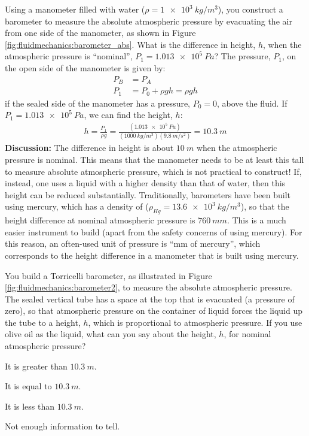 {{\begin{example}{Using a manometer filled with water ($\rho=\SI{1e3}{kg/m^3}$), you construct a barometer to measure the absolute atmospheric pressure by evacuating the air from one side of the manometer, as shown in Figure \ref{fig:fluidmechanics:barometer_abs}. What is the difference in height, $h$, when the atmospheric pressure is ``nominal'', $P_1=\SI{1.013e5}{Pa}$?}
The pressure, $P_1$, on the open side of the manometer is given by:
\begin{align*}
P_B &= P_A\\
P_1&= P_0 + \rho g h = \rho g h
\end{align*}
if the sealed side of the manometer has a pressure, $P_0=0$, above the fluid. If $P_1=\SI{1.013e5}{Pa}$, we can find the height, $h$:
\begin{align*}
h=\frac{P_1}{\rho g}=\frac{(\SI{1.013e5}{Pa})}{(\SI{1000}{kg/m^3})(\SI{9.8}{m/s^2})}=\SI{10.3}{m}
\end{align*}
\textbf{Discussion: }The difference in height is about $\SI{10}{m}$ when the atmospheric pressure is nominal. This means that the manometer needs to be at least this tall to measure absolute atmospheric pressure, which is not practical to construct! If, instead, one uses a liquid with a higher density than that of water, then this height can be reduced substantially. Traditionally, barometers have been built using mercury, which has a density of ($\rho_{Hg}=\SI{13.6e3}{kg/m^3}$), so that the height difference at nominal atmospheric pressure is $\SI{760}{mm}$. This is a much easier instrument to build (apart from the safety concerns of using mercury). For this reason, an often-used unit of pressure is ``mm of mercury'', which corresponds to the height difference in a manometer that is built using mercury. 
\end{example}

\begin{checkpoint}
\begin{MCquestion}{You build a Torricelli barometer, as illustrated in Figure \ref{fig:fluidmechanics:barometer2}, to measure the absolute atmospheric pressure. The sealed vertical tube has a space at the top that is evacuated (a pressure of zero), so that atmospheric pressure on the container of liquid forces the liquid up the tube to a height, $h$, which is proportional to atmospheric pressure. If you use olive oil as the liquid, what can you say about the height, $h$, for nominal atmospheric pressure?}
\item It is greater than $\SI{10.3}{m}$.\correct
\item It is equal to $\SI{10.3}{m}$.
\item It is less than $\SI{10.3}{m}$.
\item Not enough information to tell.
\end{MCquestion}
\end{checkpoint}

}}
